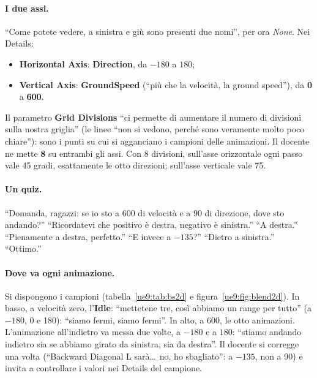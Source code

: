 \paragraph{I due assi.} ``Come potete vedere, a sinistra e giù sono presenti due nomi'',
per ora \emph{None}. Nei Details:
\begin{itemize}
  \item \textbf{Horizontal Axis}: \textbf{Direction}, da \textbf{$-180$} a
        \textbf{$180$};
  \item \textbf{Vertical Axis}: \textbf{GroundSpeed} (``più che la velocità, la ground
        speed''), da \textbf{0} a \textbf{600}.
\end{itemize}
Il parametro \textbf{Grid Divisions} ``ci permette di aumentare il numero di divisioni
sulla nostra griglia'' (le linee ``non si vedono, perché sono veramente molto poco
chiare''): sono i punti su cui si agganciano i campioni delle animazioni. Il docente ne
mette \textbf{8} su entrambi gli assi. Con 8 divisioni, sull'asse orizzontale ogni passo
vale 45 gradi, esattamente le otto direzioni; sull'asse verticale vale 75.

\paragraph{Un quiz.} ``Domanda, ragazzi: se io sto a 600 di velocità e a 90 di direzione,
dove sto andando?'' ``Ricordatevi che positivo è destra, negativo è sinistra.'' ``A
destra.'' ``Pienamente a destra, perfetto.'' ``E invece a $-135$?'' ``Dietro a
sinistra.'' ``Ottimo.''

\paragraph{Dove va ogni animazione.} Si dispongono i campioni (tabella~\ref{ue9:tab:bs2d} e
figura~\ref{ue9:fig:blend2d}). In basso, a velocità zero, l'\textbf{Idle}: ``mettetene
tre, così abbiamo un range per tutto'' (a $-180$, 0 e 180): ``siamo fermi, siamo fermi''.
In alto, a 600, le otto animazioni. L'animazione all'indietro va messa due volte, a
$-180$ e a $180$: ``stiamo andando indietro sia se abbiamo girato da sinistra, sia da
destra''. Il docente si corregge una volta (``Backward Diagonal L sarà\dots\ no, ho
sbagliato'': a $-135$, non a 90) e invita a controllare i valori nei Details del
campione.

